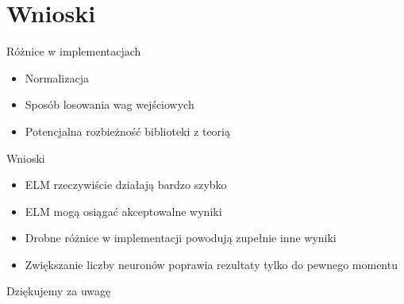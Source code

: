 \documentclass{beamer}
\begin{document}
\section{Wnioski}
\begin{frame}{Różnice w implementacjach}
\begin{itemize}
\item Normalizacja
\item Sposób losowania wag wejściowych
\item Potencjalna rozbieżność biblioteki z teorią
\end{itemize}
\end{frame}

\begin{frame}{Wnioski}
\begin{itemize}
\item ELM rzeczywiście działają bardzo szybko
\item ELM mogą osiągać akceptowalne wyniki
\item Drobne różnice w implementacji powodują zupełnie inne wyniki
\item Zwiększanie liczby neuronów poprawia rezultaty tylko do pewnego momentu
\end{itemize}
\end{frame}

\begin{frame}{Kierunki dalszych badań)
\begin{itemize}
\item Porównanie z innymi klasyfikatorami

\end{itemize}

\end{frame}

\begin{frame}
\begin{center}
\huge{Dziękujemy za uwagę}
\end{center}

\end{frame}
\end{document}

